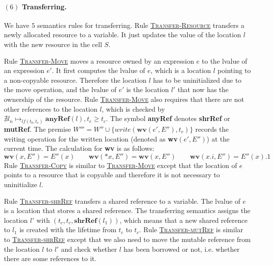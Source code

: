 \documentclass[runningheads]{llncs}
\def\refrule#1{\hyperref[#1]{\textsc{#1}}}
\newcommand{\terminal}[1]{\textbf{#1}}
\newcommand{\cfg}[1]{\langle #1\rangle}
\newcommand\ruleEnv[2]{
		\leavevmode
		\hbox{{\scriptsize
				\begin{tabular}{c}
					\multicolumn{1}{l}{\textsc{\textcolor{blue}{#1:}}}\\
					#2
		\end{tabular}}}
}
\newcommand\TwoColumn[2] {
	\begin{center}
\begin{tabular}{cc}
	#1 & #2 
\end{tabular}	\end{center}
}
\begin{document}

\paragraph{$(6)$ Transferring.}

We have $5$ semantics rules for transferring. Rule \refrule{Transfer-Resource} transfers a newly allocated resource to a variable. It just updates the value of the location $l$ with the new resource in the cell $S$.

Rule \refrule{Transfer-Move} moves a resource owned by an expression $e$ to the lvalue of an expression $e'$.
It first computes the lvalue of $e$, which is a location $l$ pointing to a non-copyable resource.
Therefore the location $l$ has to be uninitialized due to the move operation, and
the lvalue of  $e'$ is the location $l'$ that now has the ownership of the resource.
Rule \refrule{Transfer-Move} also requires that there are not other references to the location $l$,
which is checked by $\nexists l_n\mapsto_{lf(t_b,t_e)}\terminal{anyRef}(l),t_e\geq t_c$.
The symbol \terminal{anyRef} denotes \terminal{shrRef} or \terminal{mutRef}.
The premise $W'''=W''\cup\{write(\terminal{wv}(e',E''),t_c)\}$ records the
writing operation for the written location (denoted as \terminal{wv}$(e',E'')$) at the current time. 
The calculation for \terminal{wv} is as follows: 
\[
\terminal{wv}(x,E'')=E''(x)\quad\quad\terminal{wv}(*x,E'')=\terminal{wv}(x,E'')\quad\quad\terminal{wv}(x.i,E'')=E''(x).1
\]
Rule \refrule{Transfer-Copy} is similar to \refrule{Transfer-Move} except that the location of  $e$ points to a resource that is copyable and therefore it is not necessary to uninitialize $l$.

Rule \refrule{Transfer-shrRef} transfers a shared reference to a variable.
The lvalue of $e$ is a location that stores a shared reference.
The transferring semantics assigns the location $l'$ with $(t_c,t_c,\terminal{shrRef}(l_1))$,
which 
means that a new shared reference to $l_1$ is created with the lifetime from $t_c$ to $t_c$.
Rule \refrule{Transfer-mutRef} is similar to \refrule{Transfer-shrRef} except that we also need to 
move the mutable reference from the location $l$ to $l'$ and check whether $l$ has been borrowed or not, i.e. whether there are some references to it.
\end{document}
